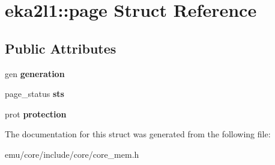 \hypertarget{structeka2l1_1_1page}{}\section{eka2l1\+:\+:page Struct Reference}
\label{structeka2l1_1_1page}
\subsection*{Public Attributes}
\begin{DoxyCompactItemize}
\item 
\mbox{\label{structeka2l1_1_1page_a0b3ecf1809578c1dd06b4e963607186d}} 
gen {\bfseries generation}
\item 
\mbox{\label{structeka2l1_1_1page_aa2008f7307ad2763b38a5a2e1a00d487}} 
page\+\_\+status {\bfseries sts}
\item 
\mbox{\label{structeka2l1_1_1page_a6e6376e181dcf8b5f5d870852021af63}} 
prot {\bfseries protection}
\end{DoxyCompactItemize}


The documentation for this struct was generated from the following file\+:\begin{DoxyCompactItemize}
\item 
emu/core/include/core/core\+\_\+mem.\+h\end{DoxyCompactItemize}
